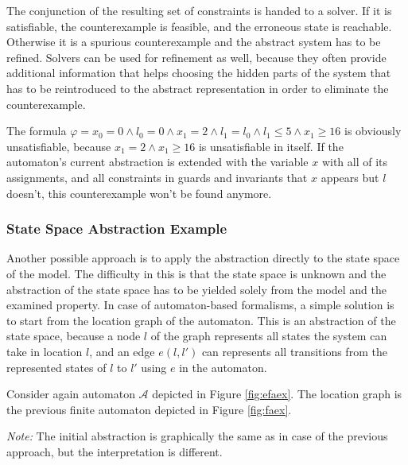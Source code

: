 The conjunction of the resulting set of constraints is handed to a solver. If it is satisfiable, the counterexample is feasible, and the erroneous state is reachable. Otherwise it is a spurious counterexample and the abstract system has to be refined. Solvers can be used for refinement as well, because they often provide additional information that helps choosing the hidden parts of the system that has to be reintroduced to the abstract representation in order to eliminate the counterexample.

\begin{example}
	The formula $\varphi = x_0=0 \wedge l_0=0 \wedge x_1=2 \wedge l_1=l_0 \wedge l_1 \leq 5 \wedge x_1 \geq 16$ is obviously unsatisfiable, because $x_1=2 \wedge x_1 \geq 16$ is unsatisfiable in itself. If the automaton's current abstraction is extended with the variable $x$ with all of its assignments, and all constraints in guards and invariants that $x$ appears but $l$ doesn't, this counterexample won't be found anymore.
\end{example}

\subsubsection{State Space Abstraction Example} \label{sec:cegarex2}

Another possible approach is to apply the abstraction directly to the state space of the model. The difficulty in this is that the state space is unknown and the abstraction of the state space has to be yielded solely from the model and the examined property. In case of automaton-based formalisms, a simple solution is to start from the location graph of the automaton. This is an abstraction of the state space, because a node $l$ of the graph represents all states the system can take in location $l$, and an edge $e(l,l')$ can represents all transitions from the represented states of $l$ to $l'$ using $e$ in the automaton.

 \begin{example}
 	Consider again automaton $\mathcal{A}$ depicted in Figure \ref{fig:efaex}. The location graph is the previous finite automaton depicted in Figure \ref{fig:faex}.
 	
 	\emph{Note:} The initial abstraction is graphically the same as in case of the previous approach, but the interpretation is different.
 \end{example}

